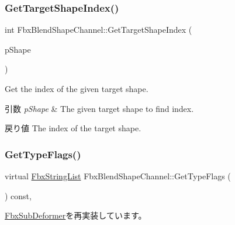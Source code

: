 \subsubsection{\texorpdfstring{Get\+Target\+Shape\+Index()}{GetTargetShapeIndex()}}
{\footnotesize\ttfamily int Fbx\+Blend\+Shape\+Channel\+::\+Get\+Target\+Shape\+Index (\begin{DoxyParamCaption}\item[{\hyperlink{class_fbx_shape}{Fbx\+Shape} $\ast$}]{p\+Shape }\end{DoxyParamCaption})}

Get the index of the given target shape. 
\begin{DoxyParams}{引数}
{\em p\+Shape} & The given target shape to find index. \\
\hline
\end{DoxyParams}
\begin{DoxyReturn}{戻り値}
The index of the target shape. 
\end{DoxyReturn}
\mbox{\label{class_fbx_blend_shape_channel_a354002154ea342025ba0936e656b640a}} 
\subsubsection{\texorpdfstring{Get\+Type\+Flags()}{GetTypeFlags()}}
{\footnotesize\ttfamily virtual \hyperlink{class_fbx_string_list}{Fbx\+String\+List} Fbx\+Blend\+Shape\+Channel\+::\+Get\+Type\+Flags (\begin{DoxyParamCaption}{ }\end{DoxyParamCaption}) const\hspace{0.3cm}{\ttfamily [protected]}, {\ttfamily [virtual]}}



\hyperlink{class_fbx_sub_deformer_a80652fd0521b2ea1897e221e5ae1b5cf}{Fbx\+Sub\+Deformer}を再実装しています。

\mbox{\label{class_fbx_blend_shape_channel_a13265acf6f671cf6ec1228105831ff15}} 
